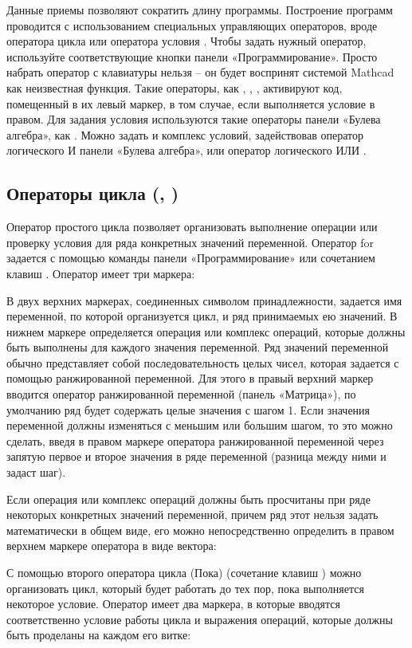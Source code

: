 Данные приемы позволяют сократить длину программы.
Построение программ проводится с использованием специальных управляющих операторов, вроде оператора цикла  или оператора условия . Чтобы задать нужный оператор, используйте соответствующие кнопки панели «Программирование». Просто набрать оператор с клавиатуры нельзя – он будет воспринят системой Mathcad как неизвестная функция.
Такие операторы, как , , , активируют код, помещенный в их левый маркер, в том случае, если выполняется условие в правом. Для задания условия используются такие операторы панели «Булева алгебра», как . Можно задать и комплекс условий, задействовав оператор логического И  панели «Булева алгебра», или оператор логического ИЛИ .

\subsection*{Операторы цикла (, )}

Оператор простого цикла  позволяет организовать выполнение операции или проверку условия для ряда конкретных значений переменной. Оператор for задается с помощью команды панели «Программирование» или сочетанием клавиш . Оператор  имеет три маркера:



В двух верхних маркерах, соединенных символом принадлежности, задается имя переменной, по которой организуется цикл, и ряд принимаемых ею значений. В нижнем маркере определяется операция или комплекс операций, которые должны быть выполнены для каждого значения переменной. Ряд значений переменной обычно представляет собой последовательность целых чисел, которая задается с помощью ранжированной переменной. Для этого в правый верхний маркер вводится оператор ранжированной переменной (панель «Матрица»), по умолчанию ряд будет содержать целые значения с шагом 1. Если значения переменной должны изменяться с меньшим или большим шагом, то это можно сделать, введя в правом маркере оператора ранжированной переменной через запятую первое и второе значения в ряде переменной (разница между ними и задаст шаг).

Если операция или комплекс операций должны быть просчитаны при ряде некоторых конкретных значений переменной, причем ряд этот нельзя задать математически в общем виде, его можно непосредственно определить в правом верхнем маркере оператора  в виде вектора:

С помощью второго оператора цикла  (Пока) (сочетание клавиш \keys{\ctrl+]} ) можно организовать цикл, который будет работать до тех пор, пока выполняется некоторое условие. Оператор  имеет два маркера, в которые вводятся соответственно условие работы цикла и выражения операций, которые должны быть проделаны на каждом его витке:



